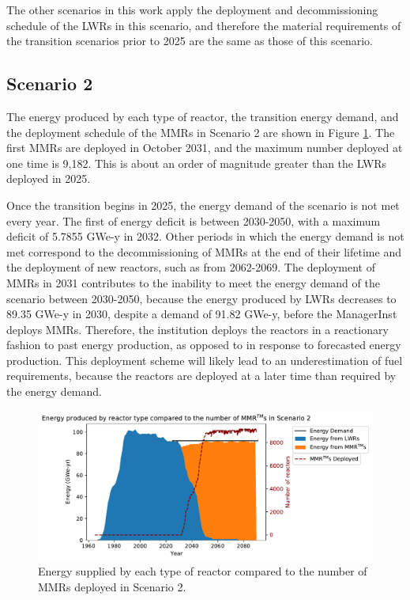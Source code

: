 The other scenarios in this work apply the deployment and decommissioning 
schedule of the \glspl{LWR} in this scenario, and therefore the material 
requirements of the transition scenarios prior to 2025 are the 
same as those of this scenario.  

\subsection{Scenario 2}
The energy produced by each type of reactor, the transition energy demand, 
and the deployment schedule of the \glspl{MMR} in Scenario 2 are shown in 
Figure \ref{fig:energy_rx_2}. The first \glspl{MMR} are deployed in 
October 2031, and the maximum number deployed at one time is 
9,182. This is about an order of magnitude greater than the \glspl{LWR}
deployed in 2025.

Once the transition begins in 2025, the energy demand of the scenario is 
not met every year. The first of energy deficit is between 2030-2050, with a 
maximum deficit 
of 5.7855 GWe-y in 2032. Other periods in which the energy demand is not met 
correspond to the decommissioning of \glspl{MMR} at the end of their lifetime 
and the deployment of new reactors, such as from 2062-2069. 
The deployment of \glspl{MMR} in 2031 contributes to the inability to 
meet the energy demand of the scenario between 2030-2050, because the energy 
produced by 
\glspl{LWR} decreases to 89.35 GWe-y in 2030, despite a demand of 91.82
GWe-y, before the \Cycamore ManagerInst deploys \glspl{MMR}.
Therefore, the institution deploys the reactors in a reactionary fashion to 
past energy production, as opposed to in response to forecasted energy 
production. This deployment scheme will likely lead to an underestimation 
of fuel requirements, because the reactors are deployed at a later time 
than required by the energy demand.

\begin{figure}
    \centering 
    \includegraphics[width=\textwidth]{../figures/energy_scenario2.pdf}
    \caption{Energy supplied by each type of reactor compared to the number of 
    \glspl{MMR} deployed in Scenario 2.}
    \label{fig:energy_rx_2}
\end{figure}

